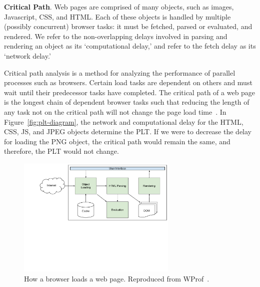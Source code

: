 \textbf{Critical Path}. Web pages are comprised of many objects, such as images, Javascript, CSS, and HTML.
Each of these objects is handled by multiple (possibly concurrent) browser tasks: it must be
fetched, parsed or evaluated, and rendered. We refer to the non-overlapping
delays involved in parsing and rendering an object as its `computational
delay,' and refer to the fetch delay as its `network delay.'

Critical path analysis is a method for analyzing the performance of parallel
processes such as browsers.
Certain load tasks are dependent on others and must wait until their
predecessor tasks have completed. The critical path of a web page is the longest chain of dependent browser tasks such that reducing the length of any task not on the critical
path will not change the page load time~\cite{sarkar1987partitioning}.
In Figure~\ref{fig:plt-diagram}, the network and computational delay for the HTML, CSS, JS, and JPEG
objects determine the PLT. If we were to decrease the delay for loading the
PNG object, the critical path would remain the same, and therefore, the PLT would not change.


\begin{figure}[t]
    \hspace{-10pt}
    \includegraphics[width=3in]{../images/network-diagram.pdf}
    \caption[]{\label{fig:network-diagram}How a browser loads a web page. Reproduced from WProf~\cite{wang2013demystifying}.}
\end{figure}
